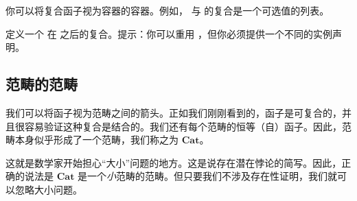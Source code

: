 \documentclass[DaoFP]{subfiles}
\begin{document}
你可以将复合函子视为容器的容器。例如，\hask{[]} 与  的复合是一个可选值的列表。

\begin{exercise}
定义一个  在  之后的复合。提示：你可以重用 ，但你必须提供一个不同的实例声明。
\end{exercise}


\subsection{范畴的范畴}

我们可以将函子视为范畴之间的箭头。正如我们刚刚看到的，函子是可复合的，并且很容易验证这种复合是结合的。我们还有每个范畴的恒等（自）函子。因此，范畴本身似乎形成了一个范畴，我们称之为 $\mathbf{Cat}$。

这就是数学家开始担心“大小”问题的地方。这是说存在潜在悖论的简写。因此，正确的说法是 $\mathbf{Cat}$ 是一个\emph{小}范畴的范畴。但只要我们不涉及存在性证明，我们就可以忽略大小问题。
\end{document}
